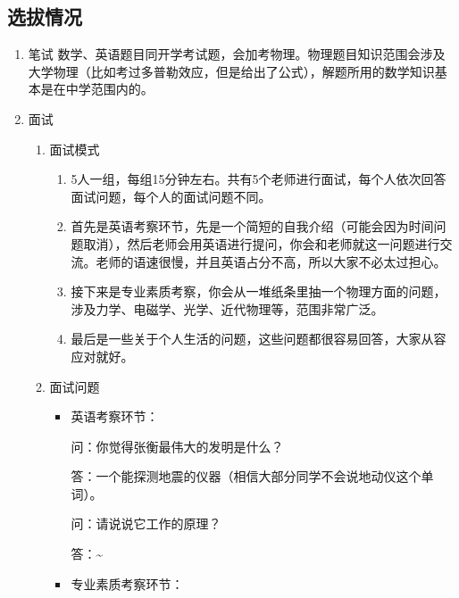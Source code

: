 \documentclass[zihao=-4,fontset=none]{Beautybook-CN}
\begin{document}
\subsection{选拔情况} 
\begin{enumerate}
	\item 笔试
	      数学、英语题目同开学考试题，会加考物理。物理题目知识范围会涉及大学物理（比如考过多普勒效应，但是给出了公式），解题所用的数学知识基本是在中学范围内的。
	      	      	      
	\item 面试
	      \begin{enumerate}
	      	\item 面试模式
	      	      \begin{enumerate}  	      	          
	      	      	\item 5人一组，每组15分钟左右。共有5个老师进行面试，每个人依次回答面试问题，每个人的面试问题不同。
	      	      	      
	      	      	\item 首先是英语考察环节，先是一个简短的自我介绍（可能会因为时间问题取消），然后老师会用英语进行提问，你会和老师就这一问题进行交流。老师的语速很慢，并且英语占分不高，所以大家不必太过担心。
	      	      	      
	      	      	\item 接下来是专业素质考察，你会从一堆纸条里抽一个物理方面的问题，涉及力学、电磁学、光学、近代物理等，范围非常广泛。
	      	      	      
	      	      	\item 最后是一些关于个人生活的问题，这些问题都很容易回答，大家从容应对就好。
	      	      \end{enumerate}   
	      	\item 面试问题
	      	      \begin{itemize}	      	          
	      	      	\item 英语考察环节：
	      	      	      
	      	      	      问：你觉得张衡最伟大的发明是什么？
	      	      	      
	      	      	      答：一个能探测地震的仪器（相信大部分同学不会说地动仪这个单词）。
	      	      	      
	      	      	      问：请说说它工作的原理？
	      	      	      
	      	      	      答：\textasciitilde{}
	      	      	      
	      	      	\item 专业素质考察环节：
	      	      	      

\end{itemize}
\end{enumerate}
\end{enumerate}
\end{document}
